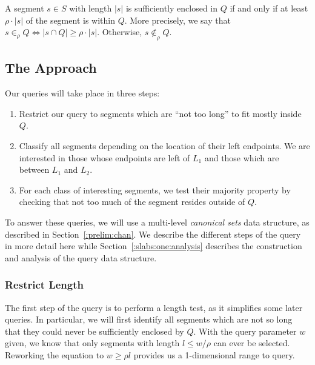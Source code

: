 A segment $s \in S$ with length $|s|$ is sufficiently enclosed in $Q$ if and only if at least $\rho \cdot |s|$ of the segment is within $Q$. More precisely, we say that $s \in_\rho Q \Leftrightarrow |s \cap Q| \geq \rho \cdot |s|$. Otherwise, $s \not \in_\rho Q$.


\subsection{The Approach}
\label{:slabs:one:approach}

Our queries will take place in three steps:

\begin{enumerate}
 \item Restrict our query to segments which are ``not too long'' to fit mostly inside $Q$.

 \item Classify all segments depending on the location of their left endpoints. We are interested in those whose endpoints are left of $L_1$ and those which are between $L_1$ and $L_2$.

 \item For each class of interesting segments, we test their majority property by checking that not too much of the segment resides outside of $Q$.

\end{enumerate}

To answer these queries, we will use a multi-level \emph{canonical sets} data structure, as described in Section~\ref{:prelim:chan}. We describe the different steps of the query in more detail here while Section~\ref{:slabs:one:analysis} describes the construction and analysis of the query data structure.


\subsubsection{Restrict Length}
\label{:slabs:one:details:restrict}

The first step of the query is to perform a length test, as it simplifies some later queries.  In particular, we will first identify all segments which are not so long that they could never be sufficiently enclosed by $Q$. With the query parameter $w$ given, we know that only segments with length $l \leq w/\rho$ can ever be selected. Reworking the equation to $w \geq \rho l$ provides us a 1-dimensional range to query.  


